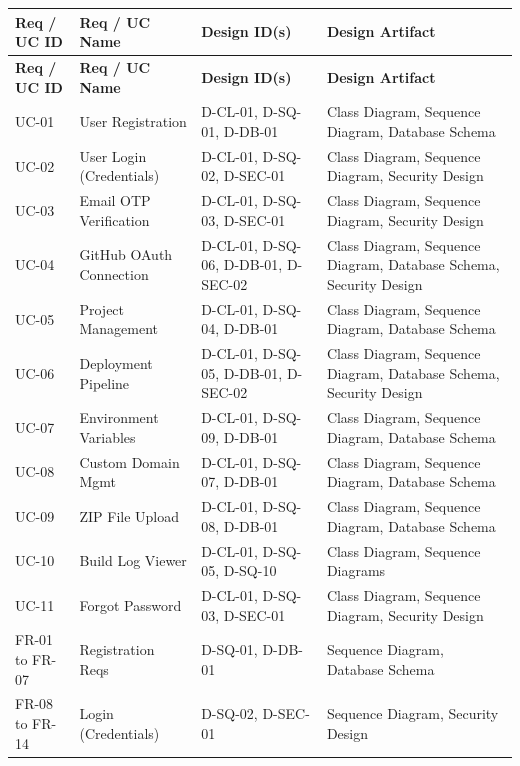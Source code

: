 \documentclass[12pt,a4paper]{article}
\begin{document}
{\footnotesize
\begin{longtable}{|>{\raggedright\arraybackslash}p{2.2cm}|>{\raggedright\arraybackslash}p{2.5cm}|>{\raggedright\arraybackslash}p{3cm}|>{\raggedright\arraybackslash}p{4cm}|}
\hline
\textbf{Req / UC ID} & \textbf{Req / UC Name} & \textbf{Design ID(s)} & \textbf{Design Artifact} \\
\hline
\endfirsthead
\hline
\textbf{Req / UC ID} & \textbf{Req / UC Name} & \textbf{Design ID(s)} & \textbf{Design Artifact} \\
\hline
\endhead

UC-01 & User Registration & D-CL-01, D-SQ-01, D-DB-01 & Class Diagram, Sequence Diagram, Database Schema \\
\hline
UC-02 & User Login (Credentials) & D-CL-01, D-SQ-02, D-SEC-01 & Class Diagram, Sequence Diagram, Security Design \\
\hline
UC-03 & Email OTP Verification & D-CL-01, D-SQ-03, D-SEC-01 & Class Diagram, Sequence Diagram, Security Design \\
\hline
UC-04 & GitHub OAuth Connection & D-CL-01, D-SQ-06, D-DB-01, D-SEC-02 & Class Diagram, Sequence Diagram, Database Schema, Security Design \\
\hline
UC-05 & Project Management & D-CL-01, D-SQ-04, D-DB-01 & Class Diagram, Sequence Diagram, Database Schema \\
\hline
UC-06 & Deployment Pipeline & D-CL-01, D-SQ-05, D-DB-01, D-SEC-02 & Class Diagram, Sequence Diagram, Database Schema, Security Design \\
\hline
UC-07 & Environment Variables & D-CL-01, D-SQ-09, D-DB-01 & Class Diagram, Sequence Diagram, Database Schema \\
\hline
UC-08 & Custom Domain Mgmt & D-CL-01, D-SQ-07, D-DB-01 & Class Diagram, Sequence Diagram, Database Schema \\
\hline
UC-09 & ZIP File Upload & D-CL-01, D-SQ-08, D-DB-01 & Class Diagram, Sequence Diagram, Database Schema \\
\hline
UC-10 & Build Log Viewer & D-CL-01, D-SQ-05, D-SQ-10 & Class Diagram, Sequence Diagrams \\
\hline
UC-11 & Forgot Password & D-CL-01, D-SQ-03, D-SEC-01 & Class Diagram, Sequence Diagram, Security Design \\
\hline
FR-01 to FR-07 & Registration Reqs & D-SQ-01, D-DB-01 & Sequence Diagram, Database Schema \\
\hline
FR-08 to FR-14 & Login (Credentials) & D-SQ-02, D-SEC-01 & Sequence Diagram, Security Design \\

\end{longtable}}
\end{document}
